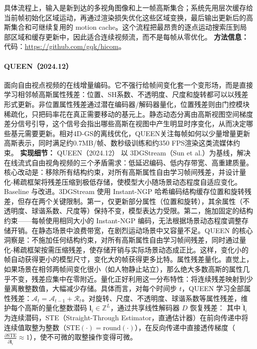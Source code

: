 具体流程上，输入是新到达的多视角图像和上一帧高斯集合；系统先用层次缓存给当前帧初始化区域运动，再通过渲染损失优化这些区域变换，最后输出更新后的高斯集合和可继续复用的 motion cache。这个流程把最昂贵的逐点运动搜索压到局部区域和缓存更新中，因此适合连续视频流，而不是每帧从零优化。
\textbf{方法信息：} 代码：\url{https://github.com/gqk/hicom}。



\paragraph{QUEEN（2024.12）\cite{2412_04469}}
面向自由视点视频的在线增量编码。它不强行给帧间变化套一个变形场，而是直接学习相邻帧高斯属性残差：位置、SH系数、不透明度、尺度和旋转都可以以残差形式更新。非位置属性残差通过潜在编码器/解码器量化，位置残差则由门控模块稀疏化，只把码率花在真正需要移动的基元上。静态动态分离由高斯视图空间梯度差分信号引导，这个信号会指出哪些高斯在视图中产生明显时序变化，从而决定哪些基元需要更新。相对4D-GS的离线优化，QUEEN关注每帧如何以少量增量更新高斯表示，同时满足约0.7MB/帧、数秒级训练和约350 FPS渲染这类流媒体约束。
\textbf{实现细节：} QUEEN（2024.12） 以 3DGStream（Sun et al.）为基线，解决在线流式自由视角视频的三个矛盾需求：低延迟编码、低内存带宽、高重建质量。核心改动是：移除所有结构约束，对所有高斯属性自由学习帧间残差，并设计量化-稀疏框架将残差压缩到极低存储，使模型大小随场景动态程度自适应变化。Baseline 与改进。3DGStream 使用 Instant-NGP 哈希编码结构缓存位置和旋转残差，但存在两个关键限制。第一，仅更新部分属性（位置和旋转），其余属性（不透明度、球谐系数、尺度等）保持不变，模型表达力受限。第二，施加固定的结构约束——每帧使用相同大小的 Instant-NGP 编码，无法根据场景动态程度调整存储开销。在静态场景中浪费带宽，在剧烈运动场景中又容量不足。QUEEN 的核心洞察是：不施加任何结构约束，对所有高斯属性自由学习帧间残差，同时通过量化-稀疏框架按需压缩残差，使存储开销与实际场景动态成正比。这样，变化小的帧自动获得更小的模型尺寸，变化大的帧获得更多比特。属性残差量化。直觉上，如果场景在相邻两帧间变化很小（如人物静止站立），那么绝大多数高斯的属性几乎不变，残差应集中在零附近。量化正好利用这一分布特性：将连续残差映射到少量离散整数值，大幅减少存储。具体而言，对每个时间步 $t$，QUEEN 学习全部属性残差：$\mathcal{A}_t = \mathcal{A}_{t-1} + \mathcal{R}_t$。对旋转、尺度、不透明度、球谐系数等属性残差，维护每个高斯的量化整数潜码 $\mathbf{l}_i \in \mathbb{Z}^L$，通过共享线性解码器 $D$ 恢复残差： 其中 $\hat{\mathbf{l}}_i$ 为连续潜码，STE（Straight-Through Estimator，直通估计器）在前向传递中将连续值取整为整数（$\mathrm{STE}(\cdot) = \mathrm{round}(\cdot)$），在反向传递中直接透传梯度（$\frac{\partial \mathrm{STE}}{\partial \hat{\mathbf{l}}_i} \approx 1$），使不可微的取整操作变得可微。
